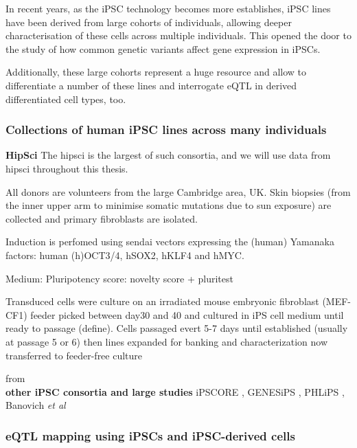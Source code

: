 In recent years, as the iPSC technology becomes more establishes, iPSC lines have been derived from large cohorts of individuals, allowing deeper characterisation of these cells across multiple individuals.
This opened the door to the study of how common genetic variants affect gene expression in iPSCs.


Additionally, these large cohorts represent a huge resource and allow to differentiate a number of these lines and interrogate eQTL in derived differentiated cell types, too.

\subsubsection{Collections of human iPSC lines across many individuals}

\textbf{HipSci}
The \gls{hipsci} is the largest of such consortia, and we will use data from \gls{hipsci} \cite{kilpinen2017common} throughout this thesis.


All donors are volunteers from the large Cambridge area, UK.
Skin biopsies (from the inner upper arm to minimise somatic mutations due to sun exposure) are collected and primary fibroblasts are isolated.

Induction is perfomed using sendai vectors expressing the (human) Yamanaka factors: human (h)OCT3/4, hSOX2, hKLF4 and hMYC.

Medium:
Pluripotency score: novelty score + pluritest \cite{muller2011bioinformatic}


Transduced cells were culture on an irradiated mouse embryonic fibroblast (MEF-CF1) feeder
picked between day30 and 40 and cultured in iPS cell medium until ready to passage (define). 
Cells passaged evert 5-7 days until established (usually at passage 5 or 6)
then lines expanded for banking and characterization
now transferred to feeder-free culture

from \cite{kilpinen2017common}\\


\textbf{other iPSC consortia and large studies}
iPSCORE \cite{panopoulos2017ipscore}, GENESiPS \cite{carcamo2017analysis}, PHLiPS \cite{pashos2017large}, Banovich \textit{et al} \cite{banovich2018impact}

\subsubsection{eQTL mapping using iPSCs and iPSC-derived cells}

